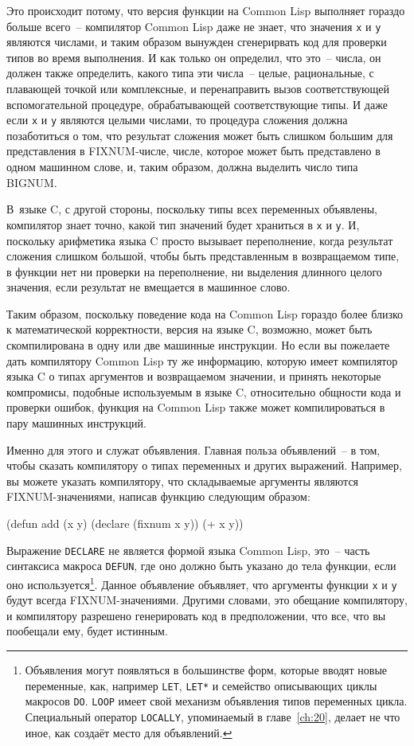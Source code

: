 Это происходит потому, что версия функции на Common Lisp выполняет гораздо больше
всего~-- компилятор Common Lisp даже не знает, что значения \lstinline{x} и \lstinline{y} являются
числами, и таким образом вынужден сгенерирвать код для проверки типов во время выполнения.
И как только он определил, что это~-- числа, он должен также определить, какого типа эти
числа~-- целые, рациональные, с плавающей точкой или комплексные, и перенаправить вызов
соответствующей вспомогательной процедуре, обрабатывающей соответствующие типы. И даже
если \lstinline{x} и \lstinline{y} являются целыми числами, то процедура сложения должна
позаботиться о том, что результат сложения может быть слишком большим для представления в
FIXNUM-числе, числе, которое может быть представлено в одном машинном слове, и, таким
образом, должна выделить число типа BIGNUM.

В~языке C, с другой стороны, поскольку типы всех переменных объявлены, компилятор знает
точно, какой тип значений будет храниться в \lstinline{x} и \lstinline{y}. И, поскольку арифметика
языка C просто вызывает переполнение, когда результат сложения слишком большой, чтобы быть
представленным в возвращаемом типе, в функции нет ни проверки на переполнение, ни
выделения длинного целого значения, если результат не вмещается в машинное слово.

Таким образом, поскольку поведение кода на Common Lisp гораздо более близко к
математической корректности, версия на языке C, возможно, может быть скомпилирована в одну
или две машинные инструкции. Но если вы пожелаете дать компилятору Common Lisp ту же
информацию, которую имеет компилятор языка C о типах аргументов и возвращаемом значении, и
принять некоторые компромисы, подобные используемым в языке C, относительно общности кода
и проверки ошибок, функция на Common Lisp также может компилироваться в пару машинных
инструкций.

Именно для этого и служат объявления. Главная польза объявлений~-- в том, чтобы сказать
компилятору о типах переменных и других выражений. Например, вы можете указать
компилятору, что складываемые аргументы являются FIXNUM-значениями, написав функцию
следующим образом:

\begin{myverb}
(defun add (x y)
  (declare (fixnum x y))
  (+ x y))
\end{myverb}

Выражение \lstinline{DECLARE} не является формой языка Common Lisp, это~-- часть
синтаксиса макроса \lstinline{DEFUN}, где оно должно быть указано до тела функции, если
оно используется\footnote{Объявления могут появляться в большинстве форм, которые вводят
  новые переменные, как, например \lstinline{LET}, \lstinline{LET*} и семейство
  описывающих циклы макросов \lstinline{DO}. \lstinline{LOOP} имеет свой механизм
  объявления типов переменных цикла. Специальный оператор \lstinline{LOCALLY}, упоминаемый
  в главе~\ref{ch:20}, делает не что иное, как создаёт место для объявлений.}. Данное
объявление объявляет, что аргументы функции \lstinline{x} и \lstinline{y} будут всегда
FIXNUM-значениями. Другими словами, это обещание компилятору, и компилятору разрешено
генерировать код в предположении, что все, что вы пообещали ему, будет истинным.

